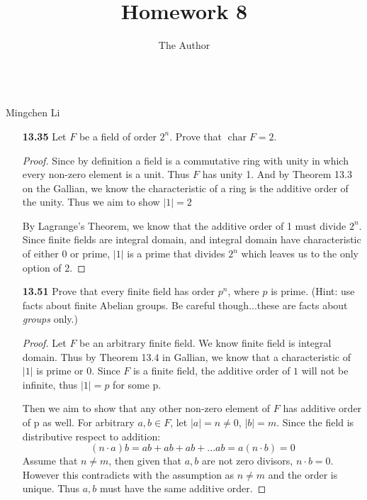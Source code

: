 \documentclass[11pt, oneside]{article}
\title{Homework 8}
\author{The Author}
\begin{document}
\begin{center}\\Mingchen Li\\ \end{center}
\thispagestyle{empty}



\hrulefill %





\begin{enumerate}

\item[{\bf 13.35}] Let $F$ be a field of order $2^n$. Prove that $\operatorname{char} F = 2$.
\begin{proof}
Since by definition a field is a commutative ring with unity in which every non-zero element is a unit. Thus $F$ has unity 1. And by Theorem 13.3 on the Gallian, we know the characteristic of a ring is the additive order of the unity. Thus we aim to show $|1|=2$

By Lagrange's Theorem, we know that the additive order of 1 must divide $2^n$. Since finite fields are integral domain, and integral domain have characteristic of either 0 or prime, $|1|$ is a prime that divides $2^n$ which leaves us to the only option of 2.
\end{proof}

\newpage
\item[{\bf 13.51}] Prove that every finite field has order $p^n$, where $p$ is prime. (Hint: use facts about finite Abelian groups. Be careful though...these are facts about {\it groups} only.)
\begin{proof}
Let $F$ be an arbitrary finite field. We know finite field is integral domain. Thus by Theorem 13.4 in Gallian, we know that a characteristic of $|1|$ is prime or 0. Since $F$ is a finite field, the additive order of $1$ will not be infinite, thus $|1|=p$ for some p. 

Then we aim to show that any other non-zero element of $F$ has additive order of p as well. For arbitrary $a,b\in F$, let $|a|=n\neq 0$, $|b|=m$. Since the field is distributive respect to addition:
\[(n\cdot a)b=ab+ab+ab+...ab=a(n\cdot b)=0\]
Assume that $n\neq m$, then given that $a,b$ are not zero divisors, $n\cdot b=0$. However this contradicts with the assumption as $n\neq m$ and the order is unique. Thus $a,b$ must have the same additive order.


\end{proof}
\end{enumerate}
\end{document}
